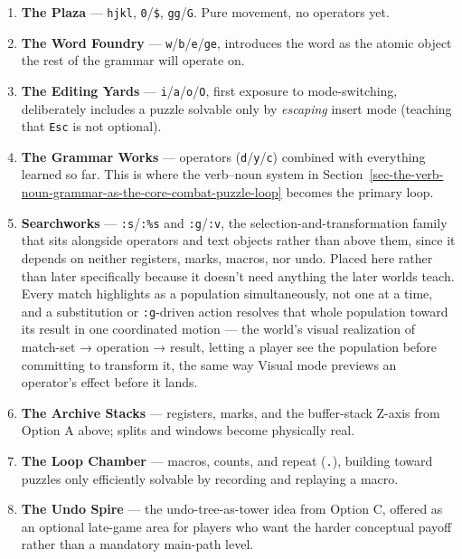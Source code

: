 \documentclass[11pt]{article}
\providecommand{\tightlist}{%
  \setlength{\itemsep}{0pt}\setlength{\parskip}{0pt}}
\begin{document}
\begin{enumerate}
\def\labelenumi{\arabic{enumi}.}
\tightlist
\item
  \textbf{The Plaza} --- \texttt{hjkl}, \texttt{0}/\texttt{\$}, \texttt{gg}/\texttt{G}. Pure movement, no operators yet.
\item
  \textbf{The Word Foundry} --- \texttt{w}/\texttt{b}/\texttt{e}/\texttt{ge}, introduces the word as the atomic
  object the rest of the grammar will operate on.
\item
  \textbf{The Editing Yards} --- \texttt{i}/\texttt{a}/\texttt{o}/\texttt{O}, first exposure to mode-switching,
  deliberately includes a puzzle solvable only by \emph{escaping} insert mode
  (teaching that \texttt{Esc} is not optional).
\item
  \textbf{The Grammar Works} --- operators (\texttt{d}/\texttt{y}/\texttt{c}) combined with everything
  learned so far. This is where the verb--noun system in Section~\ref{sec-the-verb-noun-grammar-as-the-core-combat-puzzle-loop} becomes
  the primary loop.
\item
  \textbf{Searchworks} --- \texttt{:s}/\texttt{:\%s} and \texttt{:g}/\texttt{:v}, the selection-and-transformation
  family that sits alongside operators and text objects rather than above
  them, since it depends on neither registers, marks, macros, nor undo.
  Placed here rather than later specifically because it doesn't need
  anything the later worlds teach. Every match highlights as a population
  simultaneously, not one at a time, and a substitution or \texttt{:g}-driven
  action resolves that whole population toward its result in one
  coordinated motion --- the world's visual realization of
  match-set → operation → result, letting a player see the population
  before committing to transform it, the same way Visual mode previews an
  operator's effect before it lands.
\item
  \textbf{The Archive Stacks} --- registers, marks, and the buffer-stack Z-axis from
  Option A above; splits and windows become physically real.
\item
  \textbf{The Loop Chamber} --- macros, counts, and repeat (\texttt{.}), building toward
  puzzles only efficiently solvable by recording and replaying a macro.
\item
  \textbf{The Undo Spire} --- the undo-tree-as-tower idea from Option C, offered as
  an optional late-game area for players who want the harder conceptual
  payoff rather than a mandatory main-path level.
\end{enumerate}
\end{document}
